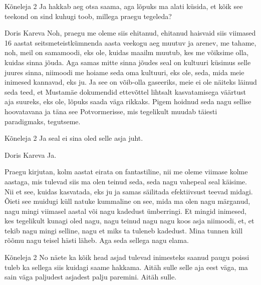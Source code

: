 Kõneleja 2
Ja hakkab aeg otsa saama, aga lõpuks ma alati küsida, et kõik see teekond on sind kuhugi toob, millega praegu tegeleda? 

Doris Kareva
Noh, praegu me oleme siis ehitanud, ehitanud haisvaid siis viimased 16 aastat seitsmeteistkümnenda aasta veekogu aeg muutuv ja arenev, me tahame, noh, meil on samamoodi, eks ole, kuidas maailm muutub, kes me võiksime olla, kuidas sinna jõuda. Aga samas mitte sinna jõudes seal on kultuuri küsimus selle juures sinna, niimoodi me hoiame seda oma kultuuri, eks ole, seda, mida meie inimesed kannavad, eks ju. Ja see on võib-olla gaseeriks, meie ei ole näiteks läinud seda teed, et Mustamäe dokumendid ettevõttel lihtsalt kasvatamisega väärtust aja suureks, eks ole, lõpuks saada väga rikkaks. Pigem hoidnud seda nagu sellise hoovatavana ja täna see Potvormerisse, mis tegelikult muudab täiesti paradigmaks, tegutseme. 

Kõneleja 2
Ja seal ei sina oled selle asja juht. 

Doris Kareva
Ja. 

Praegu kirjutan, kolm aastat eirata on fantastiline, nii me oleme viimase kolme aastaga, mis tulevad siis ma olen teinud seda, seda nagu vahepeal seal käisime. Nii et see, kuidas kasvatada, eks ju ja samas säilitada efektiivsust teevad midagi. Õieti see muidugi küll natuke kummaline on see, mida ma olen nagu märganud, nagu mingi viimasel aastal või nagu kadedust ümberringi. Et mingid inimesed, kes tegelikult kunagi oled nagu, nagu teinud nagu nagu koos asja niimoodi, et, et tekib nagu mingi selline, nagu et miks ta tuleneb kadedust. Mina tunnen küll rõõmu nagu teisel hästi läheb. Aga seda sellega nagu elama. 

Kõneleja 2
No näete ka kõik head asjad tulevad inimesteks saanud paugu poissi tuleb ka sellega siis kuidagi saame hakkama. Aitäh sulle selle aja eest väga, ma sain väga paljudest asjadest palju paremini. Aitäh sulle. 